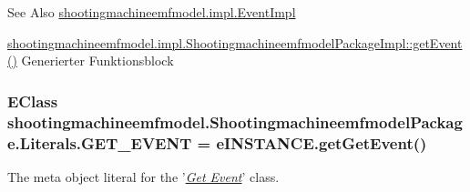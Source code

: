 \begin{DoxySeeAlso}{See Also}
\hyperlink{classshootingmachineemfmodel_1_1impl_1_1_event_impl}{shootingmachineemfmodel.\-impl.\-Event\-Impl} 

\hyperlink{classshootingmachineemfmodel_1_1impl_1_1_shootingmachineemfmodel_package_impl_ab8a65c25b50ad542b99ae48c8e84e808}{shootingmachineemfmodel.\-impl.\-Shootingmachineemfmodel\-Package\-Impl\-::get\-Event()} Generierter Funktionsblock 
\end{DoxySeeAlso}
\hypertarget{interfaceshootingmachineemfmodel_1_1_shootingmachineemfmodel_package_1_1_literals_a33cdd3a6ccbe45b441e89418a368043f}{
\subsubsection[{G\-E\-T\-\_\-\-E\-V\-E\-N\-T}]{\setlength{\rightskip}{0pt plus 5cm}E\-Class shootingmachineemfmodel.\-Shootingmachineemfmodel\-Package.\-Literals.\-G\-E\-T\-\_\-\-E\-V\-E\-N\-T = e\-I\-N\-S\-T\-A\-N\-C\-E.\-get\-Get\-Event()}}\label{interfaceshootingmachineemfmodel_1_1_shootingmachineemfmodel_package_1_1_literals_a33cdd3a6ccbe45b441e89418a368043f}
The meta object literal for the '\hyperlink{classshootingmachineemfmodel_1_1impl_1_1_get_event_impl}{{\itshape Get Event}}' class.

